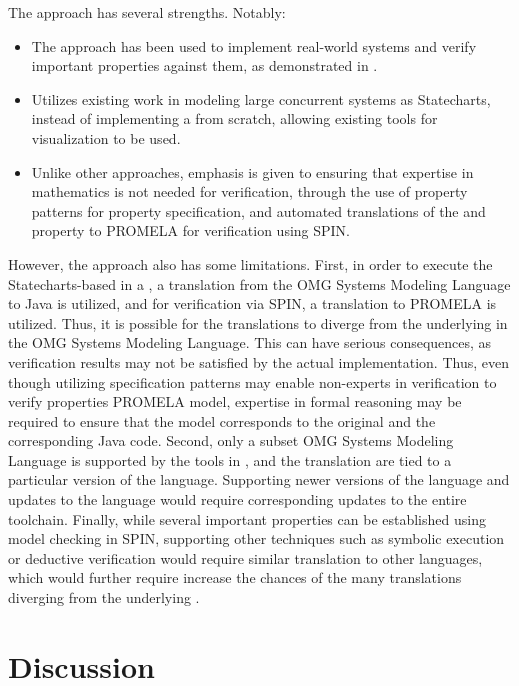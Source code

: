The \MDA{} approach has several strengths. Notably:
\begin{itemize}
  \item The approach has been used to implement real-world
    systems and verify important properties against them,
    as demonstrated in \cite{PorresECBS08}.
  \item Utilizes existing work in modeling large concurrent
    systems as Statecharts, instead of implementing a \DSL{} from
    scratch, allowing existing tools for visualization to be used.
  \item Unlike other approaches, emphasis is given to ensuring
    that expertise in mathematics is not needed for verification,
    through the use of property patterns for property specification,
    and automated translations of the \BPG{} and property to PROMELA
    for verification using SPIN.
\end{itemize}

However, the approach also has some limitations. First, in order to execute the
Statecharts-based \BPG{} in a \CDSS{}, a translation from the OMG Systems
Modeling Language \cite{OMGSpecUrl} to Java is utilized, and for
verification via SPIN, a translation to PROMELA is utilized. Thus, it
is possible for the translations to diverge from the underlying \BPG{}
in the OMG Systems Modeling Language. This can have serious
consequences, as verification results may not be satisfied by the actual
implementation. Thus, even though utilizing specification patterns
may enable non-experts in verification to verify properties PROMELA model,
expertise in formal reasoning may be required to ensure that the model
corresponds to the original \BPG{} and the corresponding Java code.
Second, only a subset OMG Systems Modeling Language is supported
by the tools in \cite{PerezJBI10,PorresECBS08}, and the translation
are tied to a particular version of the language. Supporting newer
versions of the language and updates to the language would require
corresponding updates to the entire toolchain. Finally, while several
important properties can be established using model checking in SPIN,
supporting other techniques such as symbolic execution or deductive
verification would require similar translation to other languages, which
would further require increase the chances of the many translations
diverging from the underlying \BPG{}.

\section{Discussion}\label{sec:related-work-discussion}

